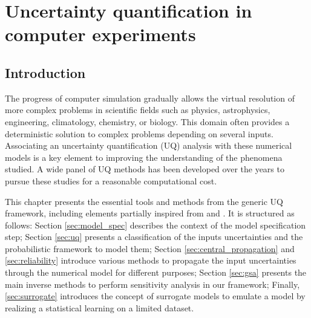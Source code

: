 \chapter{Uncertainty quantification in computer experiments}
\vspace{-5pt}
\localtableofcontents
\newpage

\section{Introduction}\label{sec:intro}

The progress of computer simulation gradually allows the virtual resolution of more complex problems in scientific fields such as physics, astrophysics, engineering, climatology, chemistry, or biology. 
This domain often provides a deterministic solution to complex problems depending on several inputs. 
Associating an uncertainty quantification (UQ) analysis with these numerical models is a key element to improving the understanding of the phenomena studied. 
A wide panel of UQ methods has been developed over the years to pursue these studies for a reasonable computational cost. 

This chapter presents the essential tools and methods from the generic UQ framework, including elements partially inspired from \citet{sullivan_2015} and \citet{chabridon_2018_thesis}. 
It is structured as follows: Section \ref{sec:model_spec} describes the context of the model specification step; 
Section \ref{sec:uq} presents a classification of the inputs uncertainties and the probabilistic framework to model them; 
Section \ref{sec:central_propagation} and \ref{sec:reliability} introduce various methods to propagate the input uncertainties through the numerical model for different purposes; 
Section \ref{sec:gsa} presents the main inverse methods to perform sensitivity analysis in our framework; 
Finally, \ref{sec:surrogate} introduces the concept of surrogate models to emulate a model by realizing a statistical learning on a limited dataset.


